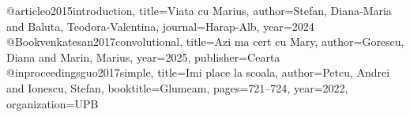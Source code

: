 @article{o2015introduction,
title={Viata cu Marius},
author={Stefan, Diana-Maria and Baluta, Teodora-Valentina},
journal={Harap-Alb},
year={2024}
}
@Book{venkatesan2017convolutional,
title={Azi ma cert cu Mary},
author={Gorescu, Diana and Marin, Marius},
year={2025},
publisher={Cearta}
}
@inproceedings{guo2017simple,
title={Imi place la scoala},
author={Petcu, Andrei and Ionescu, Stefan},
booktitle={Glumeam},
pages={721--724},
year={2022},
organization={UPB}
}